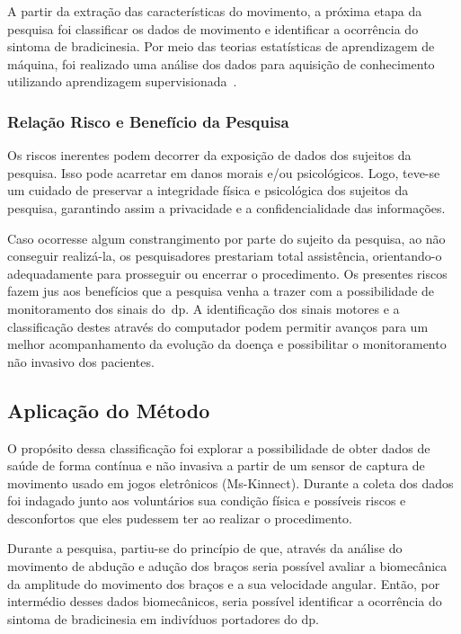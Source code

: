 A partir da extração das características do movimento, a próxima etapa da pesquisa foi classificar os dados de movimento e identificar a ocorrência do sintoma de bradicinesia. Por meio das teorias estatísticas de aprendizagem de máquina, foi realizado uma análise dos dados para aquisição de conhecimento utilizando aprendizagem supervisionada~\cite{kantardzic2011data}. 


\subsubsection{Relação Risco e Benefício da Pesquisa}
Os riscos inerentes podem decorrer da exposição de dados dos sujeitos da pesquisa. Isso pode acarretar em danos morais e/ou psicológicos. Logo, teve-se um cuidado de preservar a integridade física e psicológica dos sujeitos da pesquisa, garantindo assim a privacidade e a confidencialidade das informações.

Caso ocorresse algum constrangimento por parte do sujeito da pesquisa, ao não conseguir realizá-la, os pesquisadores prestariam total assistência, orientando-o adequadamente para prosseguir ou encerrar o procedimento. Os presentes riscos fazem jus aos benefícios que a pesquisa venha a trazer com a possibilidade de monitoramento dos sinais do~\ac{dp}. A identificação dos sinais motores e a classificação destes através do computador podem permitir avanços para um melhor acompanhamento da evolução da doença e possibilitar o monitoramento não invasivo dos pacientes.



\subsection{Aplicação do Método}
O propósito dessa classificação foi explorar a possibilidade de obter dados de saúde de forma contínua e não invasiva a partir de um sensor de captura de movimento usado em jogos eletrônicos (Ms-Kinnect). Durante a coleta dos dados foi indagado junto aos voluntários sua condição física e possíveis riscos e desconfortos que eles pudessem ter ao realizar o procedimento. 

Durante a pesquisa, partiu-se do princípio de que, através da análise do movimento de abdução e adução dos braços seria possível avaliar a biomecânica da amplitude do movimento dos braços e a sua velocidade angular. Então, por intermédio desses dados biomecânicos, seria possível identificar a ocorrência do sintoma de bradicinesia em indivíduos portadores do \ac{dp}.




